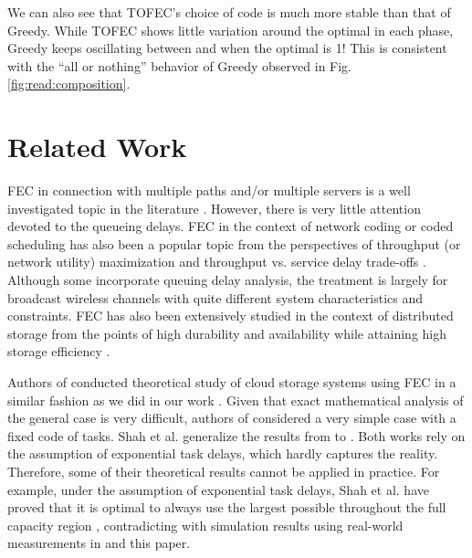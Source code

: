 \documentclass[journal]{IEEEtran}
\newcommand{\ourproposal}{TOFEC\xspace}
\begin{document}
We can also see that \ourproposal's choice of code is much more stable than that of Greedy. 
While \ourproposal shows little variation around the optimal in each phase, Greedy keeps oscillating between  and  when the optimal is 1! This is consistent with the ``all or nothing'' behavior of Greedy observed in Fig.\ref{fig:read:composition}.







\section{Related Work}
\label{sec:related}

FEC in connection with multiple paths and/or multiple servers is a well investigated topic in the literature \cite{VickySharmaMPLOT,EminGabrielyanFEC,JohnByersAccessing,RSaadEvaluating}. However, there is very little attention devoted to the queueing delays. FEC in the context of network coding or coded scheduling has also been a popular topic from the perspectives of throughput (or network utility) maximization and throughput vs. service delay trade-offs \cite{Eryilmaz:2008:DTG:2263482.2273567,Yeownetworkcoding,Theodorosnetworkcoding, KozatScheduling}. Although some incorporate queuing delay analysis, the treatment is largely for broadcast wireless channels with quite different system characteristics and constraints.
FEC has also been extensively studied in the context of distributed storage from the points of high durability and availability while attaining high storage efficiency \cite{Dimakis:2010:NCD:1861840.1861868,Rodrigues_highavailability,Li:2010:TDR:1833515.1833884}. 

Authors of \cite{Longbocodeingincloud} conducted theoretical study of cloud storage systems using FEC in a similar fashion as we did in our work \cite{fastcloud}. Given that exact mathematical analysis of the general case is very difficult, authors of \cite{Longbocodeingincloud} considered a very simple case with a fixed code of  tasks. Shah et al. \cite{MDS-queue} generalize the results from \cite{Longbocodeingincloud} to . Both works rely on the assumption of exponential task delays, which hardly captures the reality. Therefore, some of their theoretical results cannot be applied in practice.
For example, under the assumption of exponential task delays, Shah et al. have proved that it is optimal to always use the largest  possible throughout the full capacity region ,
contradicting with simulation results using real-world measurements in \cite{fastcloud} and this paper. 
\end{document}

